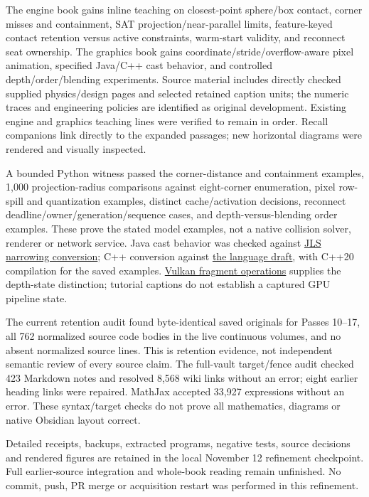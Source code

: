 The engine book gains inline teaching on closest-point sphere/box contact, corner misses and containment, SAT projection/near-parallel limits, feature-keyed contact retention versus active constraints, warm-start validity, and reconnect seat ownership. The graphics book gains coordinate/stride/overflow-aware pixel animation, specified Java/C++ cast behavior, and controlled depth/order/blending experiments. Source material includes directly checked supplied physics/design pages and selected retained caption units; the numeric traces and engineering policies are identified as original development. Existing engine and graphics teaching lines were verified to remain in order. Recall companions link directly to the expanded passages; new horizontal diagrams were rendered and visually inspected.

A bounded Python witness passed the corner-distance and containment examples, 1,000 projection-radius comparisons against eight-corner enumeration, pixel row-spill and quantization examples, distinct cache/activation decisions, reconnect deadline/owner/generation/sequence cases, and depth-versus-blending order examples. These prove the stated model examples, not a native collision solver, renderer or network service. Java cast behavior was checked against \href{https://docs.oracle.com/javase/specs/jls/se21/html/jls-5.html\#jls-5.1.3}{JLS narrowing conversion}; C++ conversion against \href{https://eel.is/c++draft/conv.fpint}{the language draft}, with C++20 compilation for the saved examples. \href{https://docs.vulkan.org/spec/latest/chapters/fragops.html}{Vulkan fragment operations} supplies the depth-state distinction; tutorial captions do not establish a captured GPU pipeline state.

The current retention audit found byte-identical saved originals for Passes 10--17, all 762 normalized source code bodies in the live continuous volumes, and no absent normalized source lines. This is retention evidence, not independent semantic review of every source claim. The full-vault target/fence audit checked 423 Markdown notes and resolved 8,568 wiki links without an error; eight earlier heading links were repaired. MathJax accepted 33,927 expressions without an error. These syntax/target checks do not prove all mathematics, diagrams or native Obsidian layout correct.

Detailed receipts, backups, extracted programs, negative tests, source decisions and rendered figures are retained in the local {November 12 refinement checkpoint}. Full earlier-source integration and whole-book reading remain unfinished. No commit, push, PR merge or acquisition restart was performed in this refinement.

